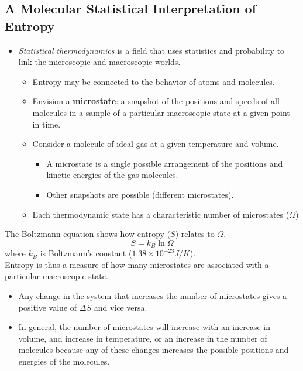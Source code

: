 \documentclass[10pt]{article}
\begin{document}
\subsection*{A Molecular Statistical Interpretation of Entropy}
\begin{itemize}
    \item \textit{Statistical thermodynamics} is a field that uses statistics and probability to link the microscopic and macroscopic worlds.
    \begin{itemize}
        \item Entropy may be connected to the behavior of atoms and molecules.
        \item Envision a \textbf{microstate}: a snapshot of the positions and speeds of all molecules in a sample of a particular macroscopic state at a given point in time.
        \item Consider a molecule of ideal gas at a given temperature and volume.
        \begin{itemize}
            \item A microstate is a single possible arrangement of the positions and kinetic energies of the gas molecules.
            \item Other snapshots are possible (different microstates).
        \end{itemize}
        \item Each thermodynamic state has a characteristic number of microstates ($\Omega$)
    \end{itemize}
\end{itemize}
The Boltzmann equation shows how entropy ($S$) relates to $\Omega$.
\[S = k_B \ln \Omega\]
where $k_B$ is Boltzmann's constant ($1.38 \times 10^{-23} J/K$).\\
Entropy is thus a measure of how many microstates are associated with a particular macroscopic state.
\begin{itemize}
    \item Any change in the system that increases the number of microstates gives a positive value of $\Delta S$ and vice versa.
    \item In general, the number of microstates will increase with an increase in volume, and increase in temperature, or an increase in the number of molecules because any of these changes increases the possible positions and energies of the molecules.
\end{itemize}
\end{document}
